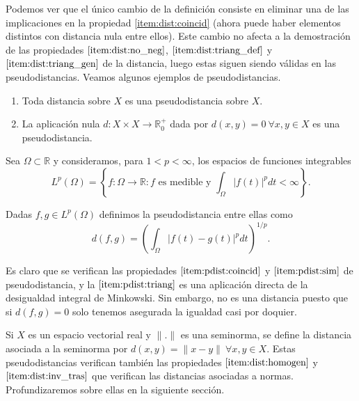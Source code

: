 \documentclass{book}
\begin{document}
Podemos ver que el único cambio de la definición consiste en eliminar una de las implicaciones en la propiedad \ref{item:dist:coincid} (ahora puede haber elementos distintos con distancia nula entre ellos). Este cambio no afecta a la demostración de las propiedades $\ref{item:dist:no_neg}$, $\ref{item:dist:triang_def}$ y $\ref{item:dist:triang_gen}$ de la distancia, luego estas siguen siendo válidas en las pseudodistancias. Veamos algunos ejemplos de pseudodistancias.

\begin{example}
	\begin{enumerate}
		\item Toda distancia sobre $X$ es una pseudodistancia sobre $X$.
		\item La aplicación nula $d:X\times X \to \mathbb{R}^+_0$ dada por $d(x,y) = 0 \ \forall x,y \in X$ es una pseudodistancia.
	\end{enumerate}
\end{example}

\begin{example}

Sea $\Omega \subset \mathbb{R}$ y consideramos, para $1 < p < \infty$, los espacios de funciones integrables 
\[L^p(\Omega)=\left\{f\colon\Omega \to \mathbb{R} \colon f \text{ es medible y } \int_{\Omega} |f(t)|^p dt < \infty \right\}.\]

Dadas $f,g \in L^p(\Omega)$ definimos la pseudodistancia entre ellas como \[d(f,g)=\left(\int_{\Omega}|f(t)-g(t)|^p dt\right)^{1/p}.\]

Es claro que se verifican las propiedades $\ref{item:pdist:coincid}$ y $\ref{item:pdist:sim}$ de pseudodistancia, y la $\ref{item:pdist:triang}$ es una aplicación directa de la desigualdad integral de Minkowski. Sin embargo, no es una distancia puesto que si $d(f,g)=0$ solo tenemos asegurada la igualdad casi por doquier.

\end{example}

\begin{example}
	Si $X$ es un espacio vectorial real y $\|.\|$ es una seminorma, se define la distancia asociada a la seminorma por $d(x,y)=\|x-y\| \ \forall x,y\in X$. Estas pseudodistancias verifican también las propiedades $\ref{item:dist:homogen}$ y $\ref{item:dist:inv_tras}$ que verifican las distancias asociadas a normas. Profundizaremos sobre ellas en la siguiente sección.
\end{example}
\end{document}

